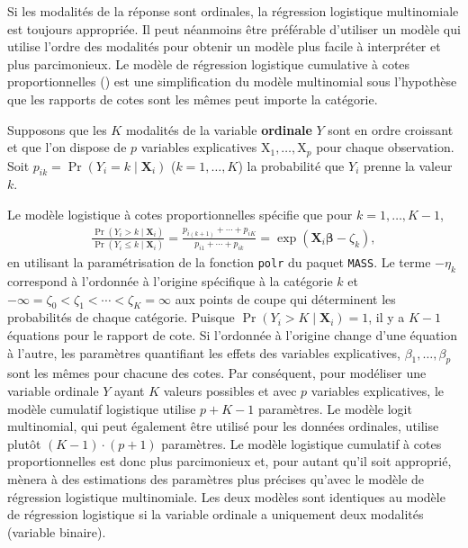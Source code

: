 \documentclass[
  11pt,
  letterpaper,
]{scrbook}
\theoremstyle{definition}
\theoremstyle{remark}
\begin{document}
Si les modalités de la réponse sont ordinales, la régression logistique
multinomiale est toujours appropriée. Il peut néanmoins être préférable
d'utiliser un modèle qui utilise l'ordre des modalités pour obtenir un
modèle plus facile à interpréter et plus parcimonieux. Le modèle de
régression logistique cumulative à cotes proportionnelles
() est une simplification
du modèle multinomial sous l'hypothèse que les rapports de cotes sont
les mêmes peut importe la catégorie.

Supposons que les \(K\) modalités de la variable \textbf{ordinale} \(Y\)
sont en ordre croissant et que l'on dispose de \(p\) variables
explicatives \(\mathrm{X}_1, \ldots, \mathrm{X}_p\) pour chaque
observation. Soit \(p_{ik}=\Pr(Y_i=k \mid \mathbf{X}_{i})\)
(\(k=1, \ldots, K\)) la probabilité que \(Y_{i}\) prenne la valeur
\(k\).

Le modèle logistique à cotes proportionnelles spécifie que pour
\(k=1, \ldots, K-1\), \begin{align*}
\frac{\Pr(Y_i > k \mid \mathbf{X}_i)}{\Pr(Y_i \leq k \mid \mathbf{X}_i)} = \frac{p_{i(k+1)} + \cdots + p_{iK}}{p_{i1} + \cdots + p_{ik}} = \exp(\mathbf{X}_i \boldsymbol{\beta} - \zeta_k),
\end{align*} en utilisant la paramétrisation de la fonction
\texttt{polr} du paquet \texttt{MASS}. Le terme \(-\eta_{k}\) correspond
à l'ordonnée à l'origine spécifique à la catégorie \(k\) et
\(-\infty=\zeta_0 < \zeta_1 < \cdots < \zeta_K =\infty\) aux points de
coupe qui déterminent les probabilités de chaque catégorie. Puisque
\(\Pr(Y_i > K \mid \mathbf{X}_i)=1\), il y a \(K-1\) équations pour le
rapport de cote. Si l'ordonnée à l'origine change d'une équation à
l'autre, les paramètres quantifiant les effets des variables
explicatives, \(\beta_1, \ldots, \beta_p\) sont les mêmes pour chacune
des cotes. Par conséquent, pour modéliser une variable ordinale \(Y\)
ayant \(K\) valeurs possibles et avec \(p\) variables explicatives, le
modèle cumulatif logistique utilise \(p + K - 1\) paramètres. Le modèle
logit multinomial, qui peut également être utilisé pour les données
ordinales, utilise plutôt \((K-1) \cdot(p+1)\) paramètres. Le modèle
logistique cumulatif à cotes proportionnelles est donc plus parcimonieux
et, pour autant qu'il soit approprié, mènera à des estimations des
paramètres plus précises qu'avec le modèle de régression logistique
multinomiale. Les deux modèles sont identiques au modèle de régression
logistique si la variable ordinale a uniquement deux modalités (variable
binaire).
\end{document}
